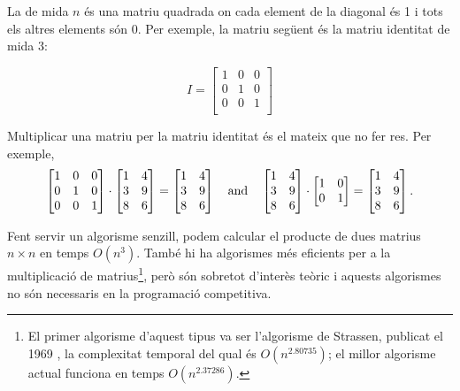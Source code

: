 
La  de mida $n$ és una matriu quadrada on cada element de la
diagonal és 1 i tots els altres elements són 0. Per exemple, la matriu
següent és la matriu identitat de mida $3$:

\[
 I = \begin{bmatrix}
  1 & 0 & 0 \\
  0 & 1 & 0 \\
  0 & 0 & 1 \\
 \end{bmatrix}
\]


Multiplicar una matriu per la matriu identitat és el mateix que no fer res.
Per exemple,
\[
 \begin{bmatrix}
  1 & 0 & 0 \\
  0 & 1 & 0 \\
  0 & 0 & 1 \\
 \end{bmatrix}
\cdot
 \begin{bmatrix}
  1 & 4 \\
  3 & 9 \\
  8 & 6 \\
 \end{bmatrix}
=
 \begin{bmatrix}
  1 & 4 \\
  3 & 9 \\
  8 & 6 \\
 \end{bmatrix} \hspace{10px} \textrm{and} \hspace{10px}
 \begin{bmatrix}
  1 & 4 \\
  3 & 9 \\
  8 & 6 \\
 \end{bmatrix}
\cdot
 \begin{bmatrix}
  1 & 0 \\
  0 & 1 \\
 \end{bmatrix}
=
 \begin{bmatrix}
  1 & 4 \\
  3 & 9 \\
  8 & 6 \\
 \end{bmatrix}.
\]


Fent servir un algorisme senzill, podem calcular el producte de dues
matrius $n \times n$ en temps $O(n^3)$. També hi ha algorismes més
eficients per a la multiplicació de matrius\footnote{El primer
algorisme d'aquest tipus va ser l'algorisme de Strassen, publicat el
1969 \cite{str69}, la complexitat temporal del qual és
$O(n^{2.80735})$; el millor algorisme actual \cite{gal14} funciona en
temps $O(n^{2.37286})$.}, però són sobretot d'interès teòric i aquests
algorismes no són necessaris en la programació competitiva.



